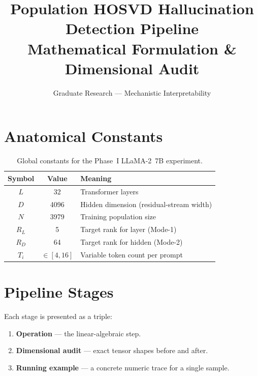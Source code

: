 \documentclass[11pt,a4paper]{article}
\title{Population HOSVD Hallucination Detection Pipeline\\
       \large Mathematical Formulation \& Dimensional Audit}
\author{Graduate Research — Mechanistic Interpretability}
\date{}
\begin{document}
\maketitle

\section{Anatomical Constants}

\begin{table}[H]
\centering
\begin{tabular}{ccl}
\toprule
\textbf{Symbol} & \textbf{Value} & \textbf{Meaning} \\
\midrule
$L$     & 32    & Transformer layers \\
$D$     & 4096  & Hidden dimension (residual-stream width) \\
$N$     & 3979  & Training population size \\
$R_L$   & 5     & Target rank for layer (Mode-1) \\
$R_D$   & 64    & Target rank for hidden (Mode-2) \\
$T_i$   & $\in [4,16]$ & Variable token count per prompt \\
\bottomrule
\end{tabular}
\caption{Global constants for the Phase~I LLaMA-2~7B experiment.}
\end{table}

\section{Pipeline Stages}

Each stage is presented as a triple:
\begin{enumerate}
  \item \textbf{Operation} — the linear-algebraic step.
  \item \textbf{Dimensional audit} — exact tensor shapes before and after.
  \item \textbf{Running example} — a concrete numeric trace for a single sample.
\end{enumerate}

\end{document}
